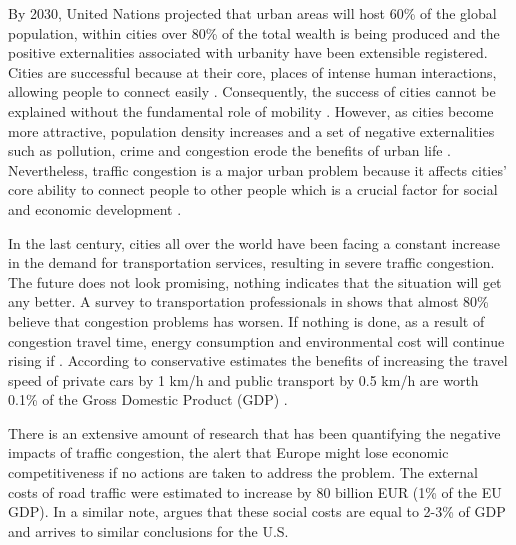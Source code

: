 \documentclass[a4paper]{jpconf}
\begin{document}
	By 2030, United Nations projected that urban areas will host 60\% of the global population, within cities over 80\% of the total wealth is being produced \parencite{McKinseyGlobalInstitute2011,UN2018} and the positive externalities associated with urbanity have been extensible registered. Cities are successful because at their core, places of intense human interactions, allowing people to connect easily \parencite{Glaeser2011}. Consequently, the success of cities cannot be explained without the fundamental role of mobility \parencite{Diakaki2003}. However, as cities become more attractive, population density increases and a set of negative externalities such as pollution, crime and congestion erode the benefits of urban life \parencite{Eurostat2016, sdgs2016, Jones1992, Glaeser2011, Stempfel2016}. Nevertheless, traffic congestion is a major urban problem \parencite{Downs1992} because it affects cities' core ability to connect people to other people which is a crucial factor for social and economic development \parencite{Falcocchio2015}. \par
	
	In the last century, cities all over the world have been facing a constant increase in the demand for transportation services, resulting in severe traffic congestion. The future does not look promising, nothing indicates that the situation will get any better. A survey to transportation professionals in \textcite{Bertini2005} shows that almost 80\% believe that congestion problems has worsen. If nothing is done, as a result of congestion travel time, energy consumption and environmental cost will continue rising if \parencite{Bull2004, Diakaki2003}. According to conservative estimates the benefits of increasing the travel speed of private cars by 1 km/h and public transport by 0.5 km/h are worth 0.1\% of the Gross Domestic Product (GDP) \parencite{Thomson2000}.\par
	
	There is an extensive amount of research that has been quantifying the negative impacts of traffic congestion, the \textcite{EuropeanCommission2001} alert that Europe might lose economic competitiveness if no actions are taken to address the problem. The external costs of road traffic were estimated to increase by 80 billion EUR (1\% of the EU GDP). In a similar note, \textcite{Cervero1998, TheTexasA&MTransportationInstitute2019, Lomax1997} argues that these social costs are equal to 2-3\% of GDP and \textcite{Schrank2011} arrives to similar conclusions for the U.S. 
	
\end{document}

